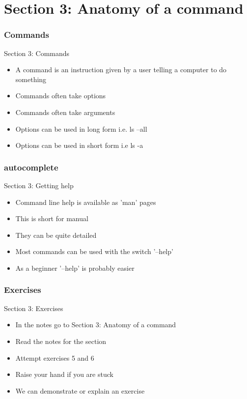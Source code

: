 \part{Section 3: Anatomy of a command}
\begin{frame}
\partpage
\end{frame}

\section{Commands}
\begin{frame}{Section 3: Commands}
\begin{itemize}
\item A command is an instruction given by a user telling a computer to do something
\item Commands often take options
\item Commands often take arguments
\item Options can be used in long form i.e. ls --all 
\item Options can be used in short form i.e ls -a
\end{itemize}
\end{frame}

\section{autocomplete}
\begin{frame}{Section 3: Getting help}
\begin{itemize}
\item Command line help is available as 'man' pages
\item This is short for manual
\item They can be quite detailed
\item Most commands can be used with the switch '--help'
\item As a beginner '--help' is probably easier
\end{itemize}
\end{frame}

\section{Exercises}
\begin{frame}{Section 3: Exercises}
\begin{itemize}
\item In the notes go to Section 3: Anatomy of a command
\item Read the notes for the section 
\item Attempt exercises 5 and 6
\item Raise your hand if you are stuck
\item We can demonstrate or explain an exercise
\end{itemize}
\end{frame}

